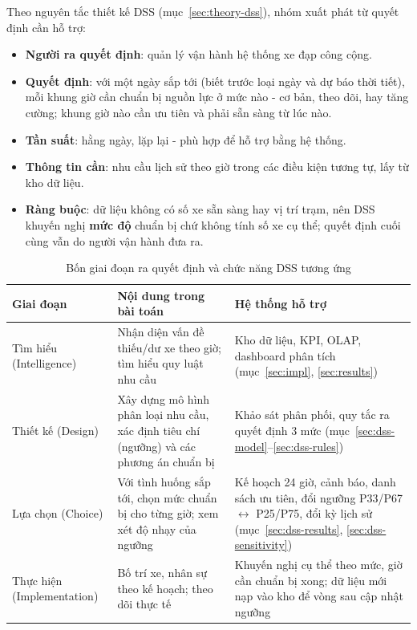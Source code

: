 \newpage
{}\label{sec:dss}

Theo nguyên tắc thiết kế DSS (mục~\ref{sec:theory-dss}), nhóm xuất phát từ quyết định cần hỗ trợ:
\begin{itemize}
    \item \textbf{Người ra quyết định}: quản lý vận hành hệ thống xe đạp công cộng.
    \item \textbf{Quyết định}: với một ngày sắp tới (biết trước loại ngày và dự báo thời tiết), mỗi khung giờ cần chuẩn bị nguồn lực ở mức nào - cơ bản, theo dõi, hay tăng cường; khung giờ nào cần ưu tiên và phải sẵn sàng từ lúc nào.
    \item \textbf{Tần suất}: hằng ngày, lặp lại - phù hợp để hỗ trợ bằng hệ thống.
    \item \textbf{Thông tin cần}: nhu cầu lịch sử theo giờ trong các điều kiện tương tự, lấy từ kho dữ liệu.
    \item \textbf{Ràng buộc}: dữ liệu không có số xe sẵn sàng hay vị trí trạm, nên DSS khuyến nghị \textbf{mức độ} chuẩn bị chứ không tính số xe cụ thể; quyết định cuối cùng vẫn do người vận hành đưa ra.
\end{itemize}

\label{sec:dss-simon}
\begin{table}[H]
\centering
\caption{Bốn giai đoạn ra quyết định và chức năng DSS tương ứng}
\label{tab:simon}
\begin{tabularx}{\textwidth}{|p{2.6cm}|X|X|}
\hline
\textbf{Giai đoạn} & \textbf{Nội dung trong bài toán} & \textbf{Hệ thống hỗ trợ} \\ \hline
Tìm hiểu (Intelligence) & Nhận diện vấn đề thiếu/dư xe theo giờ; tìm hiểu quy luật nhu cầu & Kho dữ liệu, KPI, OLAP, dashboard phân tích (mục~\ref{sec:impl}, \ref{sec:results}) \\ \hline
Thiết kế (Design) & Xây dựng mô hình phân loại nhu cầu, xác định tiêu chí (ngưỡng) và các phương án chuẩn bị & Khảo sát phân phối, quy tắc ra quyết định 3 mức (mục~\ref{sec:dss-model}--\ref{sec:dss-rules}) \\ \hline
Lựa chọn (Choice) & Với tình huống sắp tới, chọn mức chuẩn bị cho từng giờ; xem xét độ nhạy của ngưỡng & Kế hoạch 24 giờ, cảnh báo, danh sách ưu tiên, đổi ngưỡng P33/P67 $\leftrightarrow$ P25/P75, đổi kỳ lịch sử (mục~\ref{sec:dss-results}, \ref{sec:dss-sensitivity}) \\ \hline
Thực hiện (Implementation) & Bố trí xe, nhân sự theo kế hoạch; theo dõi thực tế & Khuyến nghị cụ thể theo mức, giờ cần chuẩn bị xong; dữ liệu mới nạp vào kho để vòng sau cập nhật ngưỡng \\ \hline
\end{tabularx}
\end{table}

